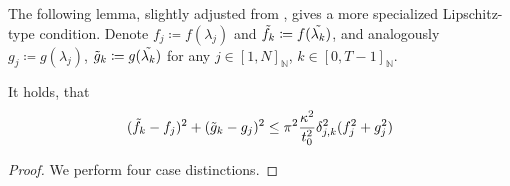 The following lemma, slightly adjusted from \cite[pp. 9-10]{Harrow2008}, gives a more specialized Lipschitz-type condition. Denote \(f_j \coloneqq f(\lambda_j)\) and \(\tilde{f}_k \coloneqq f(\tilde{\lambda_k})\), and analogously \(g_j \coloneqq g(\lambda_j)\), \(\tilde{g}_k \coloneqq g(\tilde{\lambda_k})\) for any \(j \in [1, N]_{\mathbb{N}}\), \(k \in [0, T-1]_{\mathbb{N}}\).

\begin{lemma} \label{special_lipschitz}
    It holds, that
    \begin{align}
        (\tilde{f}_k-f_j)^2 + (\tilde{g}_k-g_j)^2 \leq \pi^2 \frac{\kappa^2}{t_0^2}\delta_{j, k}^2(f_j^2+g_j^2)
    \end{align}
\end{lemma}

\begin{proof}
    We perform four case distinctions.


\end{proof}
